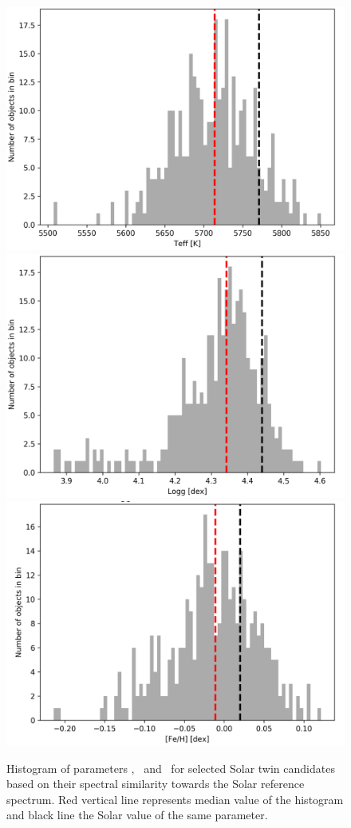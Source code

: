 \begin{figure}
	\centering
	\includegraphics[width=\columnwidth]{solar_twins_like_Teff_cannon.png}
	\includegraphics[width=\columnwidth]{solar_twins_like_Logg_cannon.png}
	\includegraphics[width=\columnwidth]{solar_twins_like_Fe_H_cannon.png}
	\caption{Histogram of parameters \Teff, \Logg\ and \Feh\ for selected Solar twin candidates based on their spectral similarity towards the Solar reference spectrum. Red vertical line represents median value of the histogram and black line the Solar value of the same parameter.}
	\label{fig:step1_params}
\end{figure}

